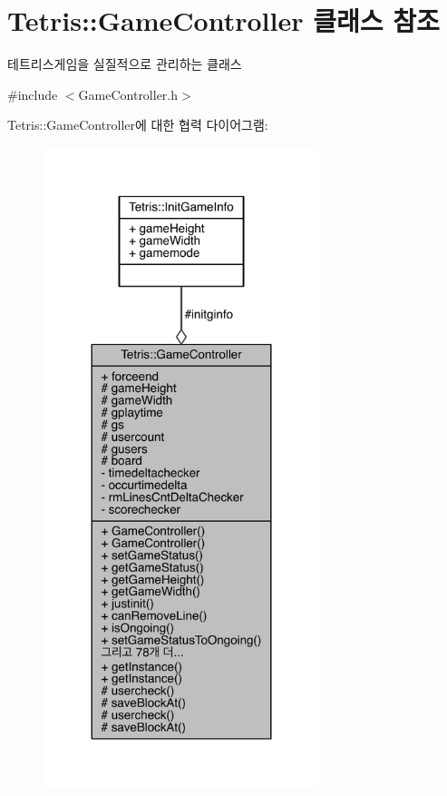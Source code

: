 \hypertarget{class_tetris_1_1_game_controller}{}\section{Tetris\+:\+:Game\+Controller 클래스 참조}
\label{class_tetris_1_1_game_controller}


테트리스게임을 실질적으로 관리하는 클래스  




{\ttfamily \#include $<$Game\+Controller.\+h$>$}



Tetris\+:\+:Game\+Controller에 대한 협력 다이어그램\+:
\nopagebreak
\begin{figure}[H]
\begin{center}
\leavevmode
\includegraphics[width=228pt]{de/df8/class_tetris_1_1_game_controller__coll__graph}
\end{center}
\end{figure}
